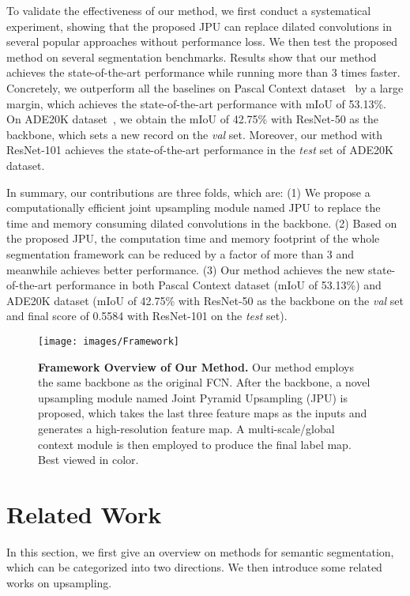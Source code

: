 \documentclass[10pt,twocolumn,letterpaper]{article}
\begin{document}
To validate the effectiveness of our method, we first conduct a systematical experiment, showing that the proposed JPU can replace dilated convolutions in several popular approaches without performance loss.
We then test the proposed method on several segmentation benchmarks.
Results show that our method achieves the state-of-the-art performance while running more than 3 times faster.
Concretely, we outperform all the baselines on Pascal Context dataset~\cite{mottaghi2014role} by a large margin, which achieves the state-of-the-art performance with mIoU of 53.13\%.
On ADE20K dataset~\cite{zhou2017scene}, we obtain the mIoU of 42.75\% with ResNet-50 as the backbone, which sets a new record on the \textit{val} set.
Moreover, our method with ResNet-101 achieves the state-of-the-art performance in the \textit{test} set of ADE20K dataset.

In summary, our contributions are three folds, which are:
(1) We propose a computationally efficient joint upsampling module named JPU to replace the time and memory consuming dilated convolutions in the backbone.
(2) Based on the proposed JPU, the computation time and memory footprint of the whole segmentation framework can be reduced by a factor of more than 3 and meanwhile achieves better performance.
(3) Our method achieves the new state-of-the-art performance in both Pascal Context dataset (mIoU of 53.13\%) and ADE20K dataset (mIoU of 42.75\% with ResNet-50 as the backbone on the \textit{val} set and final score of 0.5584 with ResNet-101 on the \textit{test} set).
\begin{figure*} 
\begin{center}
	\texttt{[image: images/Framework]}
\end{center}
	\caption{\textbf{Framework Overview of Our Method.} Our method employs the same backbone as the original FCN. After the backbone, a novel upsampling module named Joint Pyramid Upsampling (JPU) is proposed, which takes the last three feature maps as the inputs and generates a high-resolution feature map. A multi-scale/global context module is then employed to produce the final label map. Best viewed in color.}
	\label{fig:framework}
\end{figure*}
\section{Related Work}
In this section, we first give an overview on methods for semantic segmentation, which can be categorized into two directions.
We then introduce some related works on upsampling.
\end{document}
